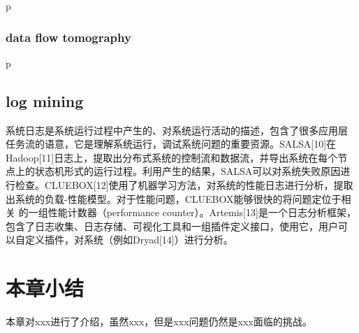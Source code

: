 p

\subsubsection*{data flow tomography}

p


\subsection{log mining}


系统日志是系统运行过程中产生的、对系统运行活动的描述，包含了很多应用层
任务流的语意，它是理解系统运行，调试系统问题的重要资源。SALSA[10]在
Hadoop[11]日志上，提取出分布式系统的控制流和数据流，并导出系统在每个节
点上的状态机形式的运行过程。利用产生的结果，SALSA可以对系统失败原因进
行检查。CLUEBOX[12]使用了机器学习方法，对系统的性能日志进行分析，提取
出系统的负载-性能模型。对于性能问题，CLUEBOX能够很快的将问题定位于相关
的一组性能计数器（performance counter）。Artemis[13]是一个日志分析框架，
包含了日志收集、日志存储、可视化工具和一组插件定义接口，使用它，用户可
以自定义插件，对系统（例如Dryad[14]）进行分析。

\section{本章小结}

本章对xxx进行了介绍，虽然xxx，但是xxx问题仍然是xxx面临的挑战。
